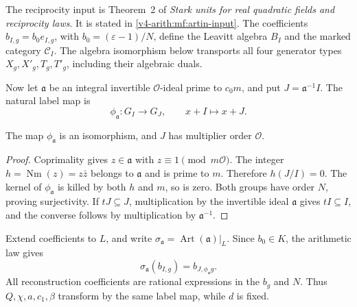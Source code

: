 The reciprocity input is Theorem~2 of
\emph{Stark units for real quadratic fields and reciprocity laws}.
It is stated in \eqref{v4-arith:mf:artin-input}.
The coefficients \(b_{I,g}=b_0e_{I,g}\), with
\(b_0=(\varepsilon-1)/N\), define the Leavitt algebra \(B_I\)
and the marked category \(\mathcal C_I\).
The algebra isomorphism below transports all four generator
types \(X_g,X'_g,T_g,T'_g\), including their algebraic duals.



Now let \(\mathfrak a\) be an integral invertible
\(\mathcal O\)-ideal prime to \(c_0m\), and put \(J=\mathfrak a^{-1}I\).
The natural label map is
\begin{equation}\label{v4-arith:at:eq:label-map}
 \phi_{\mathfrak a}:G_I\longrightarrow G_J,\qquad
 x+I\longmapsto x+J.
\end{equation}

\begin{lemma}\label{v4-arith:at:lem:labels}
The map \(\phi_{\mathfrak a}\) is an isomorphism, and \(J\) has
multiplier order \(\mathcal O\).
\end{lemma}
\begin{proof}
Coprimality gives \(z\in\mathfrak a\) with
\(z\equiv1\pmod{m\mathcal O}\). The integer
\(h=\operatorname{Nm}(z)=z\bar z\) belongs to \(\mathfrak a\)
and is prime to \(m\). Therefore \(h(J/I)=0\).
The kernel of \(\phi_{\mathfrak a}\) is killed by both \(h\)
and \(m\), so is zero. Both groups have order \(N\), proving
surjectivity. If \(tJ\subseteq J\), multiplication by the invertible
ideal \(\mathfrak a\) gives \(tI\subseteq I\), and the converse
follows by multiplication by \(\mathfrak a^{-1}\).
\end{proof}

Extend coefficients to \(L\), and write
\(\sigma_{\mathfrak a}=\operatorname{Art}(\mathfrak a)|_L\).
Since \(b_0\in K\), the arithmetic law gives
\[
 \sigma_{\mathfrak a}(b_{I,g})
       =b_{J,\phi_{\mathfrak a}g}.
\]
All reconstruction coefficients are rational expressions in the
\(b_g\) and \(N\). Thus \(Q,\chi,a,c_1,\beta\) transform by the
same label map, while \(d\) is fixed.


